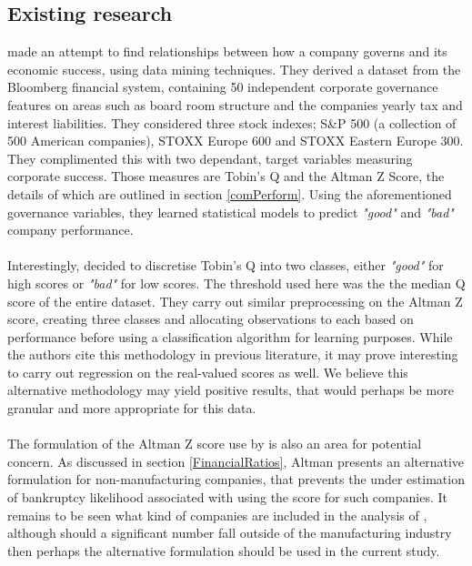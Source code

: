 {\subsection{Existing research}
{\cite{moldovan2015learning} made an attempt to find relationships between how a company governs and its economic success, using data mining techniques. They derived a dataset from the Bloomberg financial system, containing 50 independent corporate governance features on areas such as board room structure and the  companies yearly tax and interest liabilities. They considered three stock indexes; S\&P 500 (a collection of 500 American companies), STOXX Europe 600 and STOXX Eastern Europe 300. They complimented this with two dependant, target variables measuring corporate success. Those measures are Tobin's Q and the Altman Z Score, the details of which are outlined in section \ref{comPerform}. Using the aforementioned governance variables, they learned statistical models to predict {\it "good"} and {\it "bad"} company performance.\\\\
Interestingly, \cite{moldovan2015learning} decided to discretise Tobin's Q into two classes, either {\it "good"} for high scores or {\it "bad"} for low scores. The threshold used here was the the median Q score of the entire dataset. They carry out similar preprocessing on the Altman Z score, creating three classes and allocating observations to each based on performance before using a classification algorithm for learning purposes. While the authors cite this methodology in previous literature, it may prove interesting to carry out regression on the real-valued scores as well. We believe this alternative methodology may yield positive results, that would perhaps be more granular and more appropriate for this data. \\\\
The formulation of the Altman Z score use by \cite{moldovan2015learning} is also an area for potential concern. As discussed in section \ref{FinancialRatios}, Altman presents an alternative formulation for non-manufacturing companies, that prevents the under estimation of bankruptcy likelihood associated with using the score for such companies. It remains to be seen what kind of companies are included in the analysis of \cite{moldovan2015learning}, although should a significant number fall outside of the manufacturing industry then perhaps the alternative formulation should be used in the current study.   \\\\
}}
